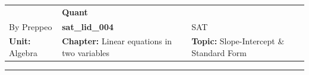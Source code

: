 \documentclass[11pt,paper=a4,answers]{exam}
\begin{document}
\begin{center}
    \centering
    \renewcommand{\arraystretch}{1.5}
    \begin{tabularx}{\textwidth}{YYY}
    & \normalsize\bf{{\Large{{Quant}}}} & \\
    By Preppeo & \normalsize\bf{{sat\_lid\_004}} & SAT\\
    \normalsize{{\textbf{{Unit:}} Algebra}} & \normalsize{{\textbf{{Chapter:}} Linear equations in two variables}} & \normalsize{{\textbf{{Topic:}} Slope-Intercept \& Standard Form}} \\
    \end{tabularx}
\end{center}
\par\noindent\rule{\textwidth}{1pt}
\end{document}
